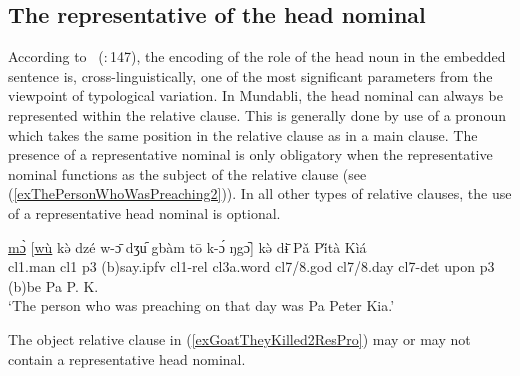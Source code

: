 \documentclass[10pt,twoside]{article}
\newcommand{\gl}[1]{`#1'}
\def\VSP{\vspace{0pt}}
\newcommand{\cl}[1]{{\sc cl#1}}
\newcommand{\citepage}[2]{\citeauthor{#1}~{(\citeyear{#1}:\,{#2})}}
\newcommand{\pref}[1]{(\ref{#1})}
\newcommand{\comment}[1]{\textcolor{blue}{\emph{#1}}}
\begin{document}
\subsection{The representative of the head nominal}\label{secMundabliRepresentativeNominal}
%
%

According to \citepage{Keenan:1985}{147}, the encoding of the role of the head noun in the 
embedded sentence is, cross-linguistically, one of the most significant parameters from 
the viewpoint of typological variation. 
In Mundabli, the head nominal can always be represented within the relative clause. This is generally done by use 
of a pronoun which takes the same position in the relative clause as in a main clause. The presence of 
a representative nominal is only obligatory when the representative nominal functions as the 
subject of the relative clause (see \pref{exThePersonWhoWasPreaching2}).
In all other types of relative clauses, the use of a representative head nominal is optional.

\begin{exe}
	\ex \label{exThePersonWhoWasPreaching2} 		
		\gll \uline{mɔ̀} [\uline{wù} kə̀ dzé w-ɔ̄ dʒu᷇ gbàm tō k-ɔ́ ŋgɔ᷆] kə̀ dɨ̄ Pǎ Pi̋tà Kìá\\
		\cl1.man	\cl1 	{\sc p3}	({\sc b})say.{\sc ipfv}	\cl1-{\sc rel}	\cl3a.word \cl7/8.god	\cl7/8.day	\cl7-{\sc det}	 upon	{\sc p3}	({\sc b})be	Pa P. K. \\
		\glt \VSP \gl{The person who was preaching on that day was Pa Peter Kia.}
\end{exe}%

The object relative clause in \pref{exGoatTheyKilled2ResPro} may or may not contain a representative head nominal.
\end{document}
